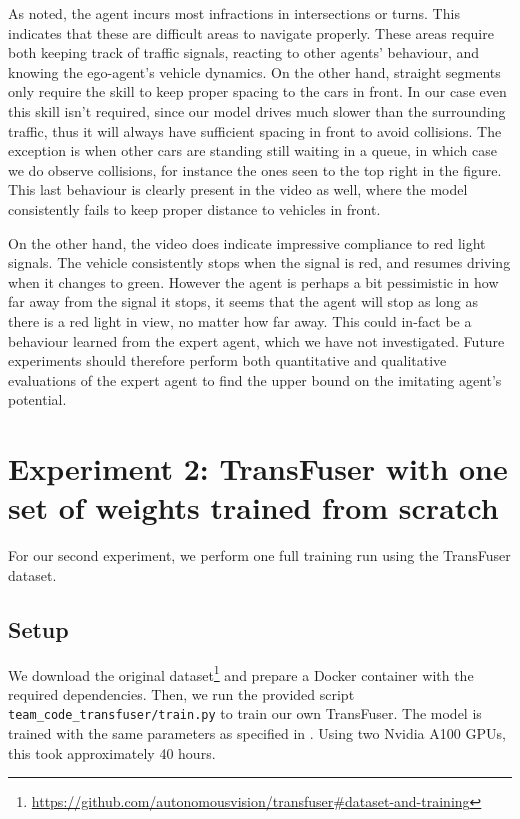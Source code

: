 As noted, the agent incurs most infractions in intersections or turns.
This indicates that these are difficult areas to navigate properly.
These areas require both keeping track of traffic signals,
reacting to other agents' behaviour,
and knowing the ego-agent's vehicle dynamics.
On the other hand,
straight segments only require the skill to keep proper spacing to the cars in front.
In our case even this skill isn't required,
since our model drives much slower than the surrounding traffic,
thus it will always have sufficient spacing in front to avoid collisions.
The exception is when other cars are standing still waiting in a queue,
in which case we do observe collisions,
for instance the ones seen to the top right in the figure.
This last behaviour is clearly present in the video as well,
where the model consistently fails to keep proper distance to vehicles in front.

On the other hand,
the video does indicate impressive compliance to red light signals.
The vehicle consistently stops when the signal is red,
and resumes driving when it changes to green.
However the agent is perhaps a bit pessimistic in how far away from the signal it stops,
it seems that the agent will stop as long as there is a red light in view,
no matter how far away.
This could in-fact be a behaviour learned from the expert agent,
which we have not investigated.
Future experiments should therefore perform both quantitative and qualitative
evaluations of the expert agent to find the upper bound on the imitating agent's potential.


\section{Experiment 2: TransFuser with one set of weights trained from scratch}
\label{sec:exp2}
For our second experiment,
we perform one full training run using the TransFuser dataset.

\subsection{Setup}
We download the original dataset\footnote{\url{https://github.com/autonomousvision/transfuser\#dataset-and-training}} and prepare a Docker container with the required dependencies.
Then, we run the provided script \texttt{team\_code\_transfuser/train.py} to train our own TransFuser.
The model is trained with the same parameters as specified in \cite{transfuser-pami}.
Using two Nvidia A100 GPUs, this took approximately 40 hours.

